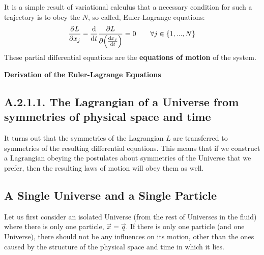 \documentclass[11pt, a4paper]{article} %
\DeclareRobustCommand{\mybox}[2][gray!10]{%
\begin{tcolorbox}[   %
        left=0.2cm,
        right=0.2cm,
        top=0.15cm,
        bottom=0.15cm,
        colback=#1,
        colframe=#1,
        width=\dimexpr\textwidth\relax, 
        enlarge left by=0mm,
        boxsep=5pt,
        arc=0pt,outer arc=0pt,
        ]
        #2
\end{tcolorbox}
}
\begin{document}
It is a simple result of variational calculus that a necessary condition for such a trajectory is to obey the $N$, so called, Euler-Lagrange equations:
\begin{equation}\label{EL}
\pdv{L}{x_j}-\dv{}{t}\pdv{L}{\qty(\dv{x_j}{t})}=0\quad \quad \forall j\in\{1,...,N\}
\end{equation}
These partial differential equations are the {\bf equations of motion} of the system.
\mybox{
{\bf Derivation of the Euler-Lagrange Equations}
}

\subsection*{A.2.1.1. The Lagrangian of a Universe from symmetries of physical space and time}

It turns out that the symmetries of the Lagrangian $L$ are transferred to symmetries of the resulting differential equations. This means that if we construct a Lagrangian obeying the postulates about symmetries of the Universe that we prefer, then the resulting laws of motion will obey them as well.

\subsection*{A Single Universe and a Single Particle}
Let us first consider an isolated Universe (from the rest of Universes in the fluid) where there is only one particle, $\vec{x}=\vec{q}$. If there is only one particle (and one Universe), there should not be any influences on its motion, other than the ones caused by the structure of the physical space and time in which it lies.
\end{document}
